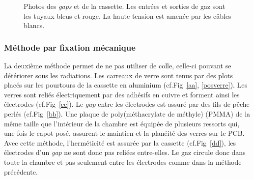 \begin{figure}[ht!]
\begin{minipage}[t]{.45\textwidth}
    \end{minipage}
 	\caption{Photos des \textit{gaps} et de la cassette. Les entrées et sorties de gaz sont les tuyaux bleus et rouge. La haute tension est amenée par les câbles blancs.}
 	\label{colle}
 \end{figure}
 
 \subsubsection{Méthode par fixation mécanique}
 La deuxième méthode permet de ne pas utiliser de colle, celle-ci pouvant se détériorer sous les radiations. Les carreaux de verre sont tenus par des plots placés sur les pourtours de la cassette en aluminium (cf.Fig~\ref{aa}, \ref{posverre}). Les verres sont reliés électriquement par des adhésifs en cuivre et forment ainsi les électrodes (cf.Fig~\ref{cc}). Le \textit{gap} entre les électrodes est assuré par des fils de pêche perlés (cf.Fig~\ref{bb}). Une plaque de poly(méthacrylate de méthyle) (PMMA) de la même taille que l'intérieur de la chambre est équipée de plusieurs ressorts qui, une fois le capot posé, assurent le maintien et la planéité des verres sur le PCB.  Avec cette méthode, l'herméticité est assurée par la cassette (cf.Fig~\ref{dd}), les électrodes d'un \textit{gap} ne sont donc pas reliées entre-elles. Le gaz circule donc dans toute la chambre et pas seulement entre les électrodes comme dans la méthode précédente.
 
